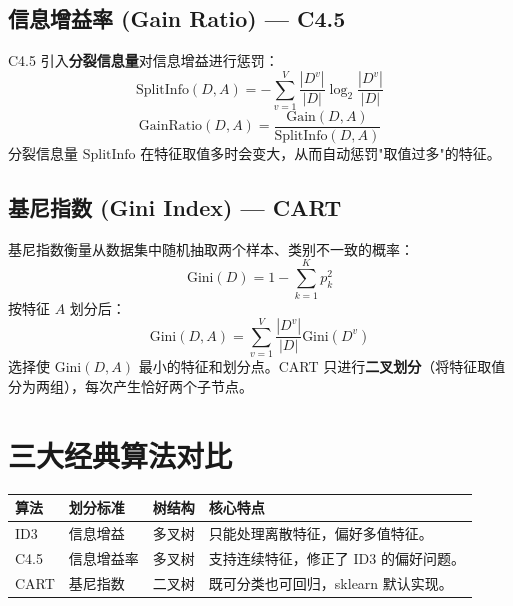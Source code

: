 \documentclass[12pt, a4paper]{book}
\begin{document}
\subsection{信息增益率 (Gain Ratio) — C4.5}
C4.5 引入\textbf{分裂信息量}对信息增益进行惩罚：
$$ \text{SplitInfo}(D, A) = -\sum_{v=1}^V \frac{|D^v|}{|D|} \log_2 \frac{|D^v|}{|D|} $$
$$ \text{GainRatio}(D, A) = \frac{\text{Gain}(D, A)}{\text{SplitInfo}(D, A)} $$
分裂信息量 $\text{SplitInfo}$ 在特征取值多时会变大，从而自动惩罚"取值过多"的特征。

\subsection{基尼指数 (Gini Index) — CART}
基尼指数衡量从数据集中随机抽取两个样本、类别不一致的概率：
$$ \text{Gini}(D) = 1 - \sum_{k=1}^K p_k^2 $$
按特征 $A$ 划分后：
$$ \text{Gini}(D, A) = \sum_{v=1}^V \frac{|D^v|}{|D|} \text{Gini}(D^v) $$
选择使 $\text{Gini}(D, A)$ 最小的特征和划分点。CART 只进行\textbf{二叉划分}（将特征取值分为两组），每次产生恰好两个子节点。

\section{三大经典算法对比}
\begin{table}[h]
\centering
\begin{tabularx}{\textwidth}{|l|l|l|X|}
\hline
\textbf{算法} & \textbf{划分标准} & \textbf{树结构} & \textbf{核心特点} \\
\hline
ID3 & 信息增益 & 多叉树 & 只能处理离散特征，偏好多值特征。 \\
\hline
C4.5 & 信息增益率 & 多叉树 & 支持连续特征，修正了 ID3 的偏好问题。 \\
\hline
CART & 基尼指数 & 二叉树 & 既可分类也可回归，sklearn 默认实现。 \\
\hline
\end{tabularx}
\end{table}
\end{document}
